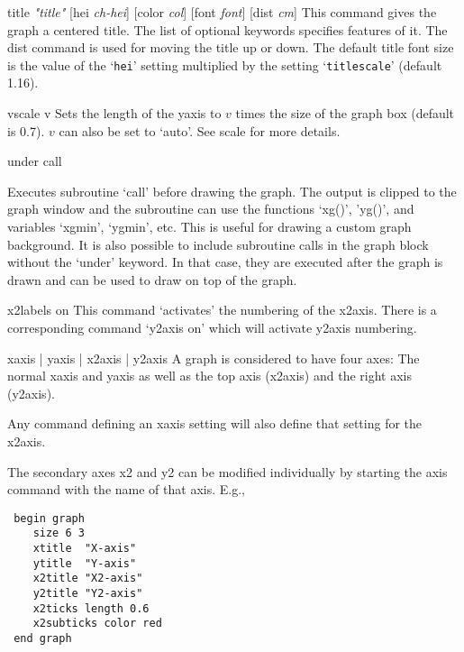 \begin{commanddescription}
\item[{\sf title {\it "title"}  [hei {\it ch-hei}] [color {\it col}] [font {\it font}] [dist {\it cm}]  }   ]
This command gives the graph a centered title.  The list of optional keywords specifies features of it.  The {\sf dist} command is used for moving the title up or down. The default title font size is the value of the `\texttt{hei}' setting multiplied by the setting `\texttt{titlescale}' (default 1.16).

\item[{\sf vscale v}]
Sets the length of the yaxis to $v$ times the size of the graph box (default is 0.7). $v$ can also be set to `{\sf auto}'. See {\sf scale} for more details.

\item[{\sf under call}]

Executes subroutine `call' before drawing the graph. The output is clipped to the graph window and the subroutine can use the functions `xg()', 'yg()', and variables `xgmin', `ygmin', etc. This is useful for drawing a custom graph background. It is also possible to include subroutine calls in the graph block without the `under' keyword. In that case, they are executed after the graph is drawn and can be used to draw on top of the graph.

\item[{\sf x2labels on}]
This command `activates' the numbering of the x2axis.  There is a
corresponding command `{\sf y2axis on}' which will activate y2axis numbering.

\item[{\sf xaxis | yaxis | x2axis | y2axis}]
A graph is considered to have four axes:  The normal xaxis and
yaxis as well as the top axis (x2axis) and the right axis (y2axis).

Any command defining an xaxis setting will also define that setting
for the x2axis.

The secondary axes x2 and y2 can be modified individually by starting the
axis command with the name of that axis. E.g.,

\begin{minipage}[c]{8cm}
\begin{Verbatim}
 begin graph
    size 6 3 
    xtitle  "X-axis"
    ytitle  "Y-axis"
    x2title "X2-axis"
    y2title "Y2-axis"
    x2ticks length 0.6
    x2subticks color red
 end graph
\end{Verbatim}
\end{minipage}
\hfill
\begin{minipage}[c]{7cm}
\mbox{}
\end{minipage}


\end{commanddescription}
